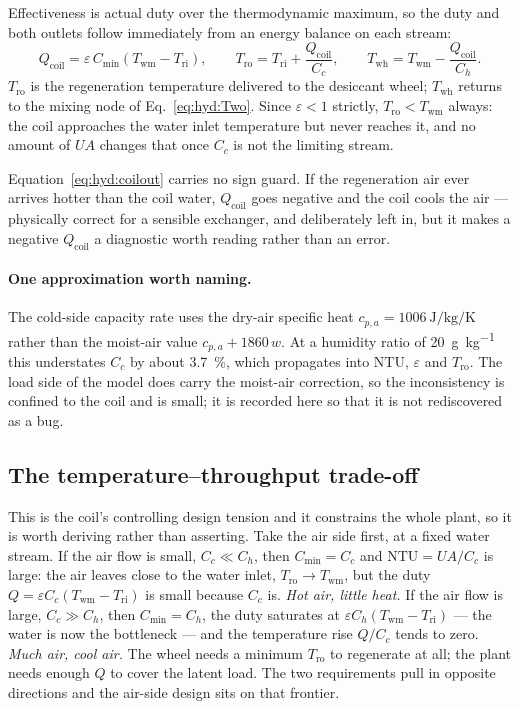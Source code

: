 \documentclass[11pt]{article}
\newcommand{\UA}{\ensuremath{U\!A}}
\begin{document}
Effectiveness is actual duty over the thermodynamic maximum, so the duty and both outlets
follow immediately from an energy balance on each stream:
\begin{equation}
Q_{\mathrm{coil}}=\varepsilon\,C_{\min}
\left(T_{\mathrm{wm}}-T_{\mathrm{ri}}\right),
\qquad
T_{\mathrm{ro}}=T_{\mathrm{ri}}+\frac{Q_{\mathrm{coil}}}{C_c},
\qquad
T_{\mathrm{wh}}=T_{\mathrm{wm}}-\frac{Q_{\mathrm{coil}}}{C_h} .
\label{eq:hyd:coilout}
\end{equation}
$T_{\mathrm{ro}}$ is the regeneration temperature delivered to the desiccant wheel;
$T_{\mathrm{wh}}$ returns to the mixing node of Eq.~\eqref{eq:hyd:Two}. Since $\varepsilon<1$
strictly, $T_{\mathrm{ro}}<T_{\mathrm{wm}}$ always: the coil approaches the water inlet
temperature but never reaches it, and no amount of $\UA$ changes that once $C_c$ is not the
limiting stream.

Equation~\eqref{eq:hyd:coilout} carries no sign guard. If the regeneration air ever arrives
hotter than the coil water, $Q_{\mathrm{coil}}$ goes negative and the coil cools the air ---
physically correct for a sensible exchanger, and deliberately left in, but it makes a negative
$Q_{\mathrm{coil}}$ a diagnostic worth reading rather than an error.

\paragraph{One approximation worth naming.} The cold-side capacity rate uses the dry-air
specific heat $c_{p,a}=\SI{1006}{\joule\per\kilogram\per\kelvin}$ rather than the moist-air
value $c_{p,a}+1860\,w$. At a humidity ratio of \SI{20}{\gram\per\kilogram} this understates
$C_c$ by about \SI{3.7}{\percent}, which propagates into $\mathrm{NTU}$, $\varepsilon$ and
$T_{\mathrm{ro}}$. The load side of the model does carry the moist-air correction, so the
inconsistency is confined to the coil and is small; it is recorded here so that it is not
rediscovered as a bug.

\subsection{The temperature--throughput trade-off}
\label{sec:hyd:tradeoff}

This is the coil's controlling design tension and it constrains the whole plant, so it is worth
deriving rather than asserting. Take the air side first, at a fixed water stream. If the air
flow is small, $C_c\ll C_h$, then
$C_{\min}=C_c$ and $\mathrm{NTU}=\UA/C_c$ is large: the air leaves close to the water inlet,
$T_{\mathrm{ro}}\to T_{\mathrm{wm}}$, but the duty $Q=\varepsilon
C_c(T_{\mathrm{wm}}-T_{\mathrm{ri}})$ is small because $C_c$ is. \emph{Hot air, little heat.}
If the air flow is large, $C_c\gg C_h$, then $C_{\min}=C_h$, the duty saturates at $\varepsilon
C_h(T_{\mathrm{wm}}-T_{\mathrm{ri}})$ --- the water is now the bottleneck --- and the
temperature rise $Q/C_c$ tends to zero. \emph{Much air, cool air.} The wheel needs a minimum
$T_{\mathrm{ro}}$ to regenerate at all; the plant needs enough $Q$ to cover the latent load.
The two requirements pull in opposite directions and the air-side design sits on that frontier.
\end{document}

